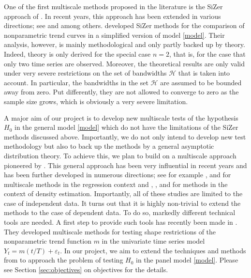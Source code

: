 \documentclass[a4paper,12pt]{article}
\begin{document}
One of the first multiscale methods proposed in the literature is the SiZer approach of \cite{ChaudhuriMarron1999, ChaudhuriMarron2000}. In recent years, this approach has been extended in various directions; see \cite{Park2004} and \cite{HannigMarron2006} among others. \cite{Park2009} developed SiZer methods for the comparison of nonparametric trend curves in a simplified version of model \eqref{model}. Their analysis, however, is mainly methodological and only partly backed up by theory. Indeed, theory is only derived for the special case $n=2$, that is, for the case that only two time series are observed. Moreover, the theoretical results are only valid under very severe restrictions on the set of bandwidths $\mathcal{H}$ that is taken into account. In particular, the bandwidths in the set $\mathcal{H}$ are assumed to be bounded away from zero. Put differently, they are not allowed to converge to zero as the sample size grows, which is obviously a very severe limitation. 


A major aim of our project is to develop new multiscale tests of the hypothesis $H_0$ in the general model \eqref{model} which do not have the limitations of the SiZer methods discussed above. Importantly, we do not only intend to develop new test methodology but also to back up the methods by a general asymptotic distribution theory. To achieve this, we plan to build on a multiscale approach pioneered by \cite{DuembgenSpokoiny2001}. This general approach has been very influential in recent years and has been further developed in numerous directions; see for example \cite{Duembgen2002}, \cite{Rohde2008} and \cite{ProkschWernerMunk2018} for multiscale methods in the regression context and \cite{DuembgenWalther2008}, \cite{RufibachWalther2010}, \cite{SchmidtHieber2013} and \cite{EckleBissantzDette2017} for methods in the context of density estimation. Importantly, all of these studies are limited to the case of independent data. It turns out that it is highly non-trivial to extend the methods to the case of dependent data. To do so, markedly different technical tools are needed. A first step to provide such tools has recently been made in \cite{KhismatullinaVogt2018}. They developed multiscale methods for testing shape restrictions of the nonparametric trend function $m$ in the univariate time series model $Y_t = m(t/T) + \varepsilon_t$. In our project, we aim to extend the techniques and methods from \cite{KhismatullinaVogt2018} to approach the problem of testing $H_0$ in the panel model \eqref{model}. Please see Section \ref{sec:objectives} on objectives for the details. 
\vspace{15pt}
\end{document}
